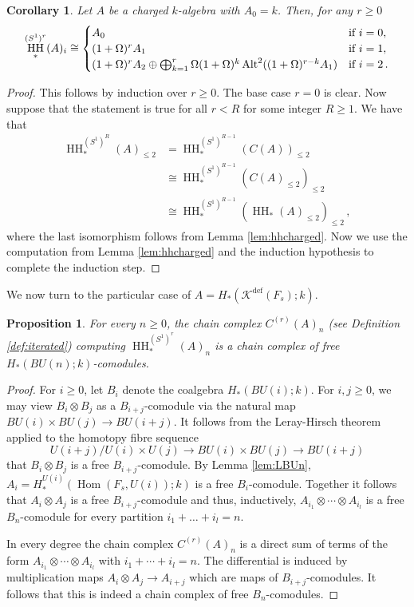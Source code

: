 \documentclass[oneside, a4paper, 12pt]{article}
\numberwithin{equation}{section}
\DeclareMathOperator{\Hom}{Hom}
\DeclareMathOperator{\HH}{HH}
\DeclareMathOperator{\Alt}{Alt}
\newcommand{\Kdef}{\mathcal{K}^{\mathrm{def}}}
\theoremstyle{plain}
\newtheorem{proposition}[theorem]{Proposition}
\newtheorem{corollary}[theorem]{Corollary}
\theoremstyle{definition}
\theoremstyle{remark}
\begin{document}
\begin{corollary} \label{cor:hhchargedalgebra}
Let $A$ be a charged $k$-algebra with $A_0=k$. Then, for any $r\geq 0$
\[
\HH^{(S^1)^r}_\ast(A)_{i}  \cong \begin{cases} A_0 & \textnormal{if }i=0, \\  (1+\Omega)^r A_1 & \textnormal{if }i=1, \\ (1+\Omega)^r A_2\oplus \bigoplus_{k=1}^r \Omega(1+\Omega)^k \Alt^2((1+\Omega)^{r-k}A_1) & \textnormal{if } i=2\, . \end{cases} 
\]
\end{corollary}
\begin{proof}
This follows by induction over $r\geq 0$. The base case $r=0$ is clear. Now suppose that the statement is true for all $r< R$ for some integer $R\geq 1$. We have that
\begin{equation*}
\begin{split}
\HH_\ast^{(S^1)^R}(A)_{\leq 2}& = \HH_\ast^{(S^1)^{R-1}}(C(A))_{\leq 2} \\& \cong \HH_\ast^{(S^1)^{R-1}}(C(A)_{\leq 2})_{\leq 2}  \\& \cong \HH_\ast^{(S^1)^{R-1}}(\HH_\ast(A)_{\leq 2})_{\leq 2} \,,
\end{split}
\end{equation*}
where the last isomorphism follows from Lemma \ref{lem:hhcharged}. Now we use the computation from Lemma \ref{lem:hhcharged} and the induction hypothesis to complete the induction step.
\end{proof}


We now turn to the particular case of $A=H_\ast(\Kdef(F_s);k)$. 



\begin{proposition} \label{prop:complexoffree}
For every $n\geq 0$, the chain complex $C^{(r)}(A)_n$ (see Definition \ref{def:iterated}) computing $\HH_\ast^{(S^1)^r}(A)_n$ is a chain complex of free $H_\ast(BU(n);k)$-comodules.
\end{proposition}
\begin{proof}
For $i\geq 0$, let $B_i$ denote the coalgebra $H_\ast(BU(i);k)$. For $i,j \geq 0$, we may view $B_i\otimes B_j$ as a $B_{i+j}$-comodule via the natural map $BU(i)\times BU(j) \to BU(i+j)$. It follows from the Leray-Hirsch theorem applied to the homotopy fibre sequence
\[
U(i+j)/U(i)\times U(j) \to BU(i)\times BU(j) \to BU(i+j)
\]
that $B_{i}\otimes B_j$ is a free $B_{i+j}$-comodule. By Lemma \ref{lem:LBUn}, $A_i=H_\ast^{U(i)}(\Hom(F_s,U(i));k)$ is a free $B_i$-comodule. Together it follows that $A_i\otimes A_j$ is a free $B_{i+j}$-comodule and thus, inductively, $A_{i_1}\otimes \cdots \otimes A_{i_l}$ is a free $B_n$-comodule for every partition $i_1+\dots + i_l=n$.

In every degree the chain complex $C^{(r)}(A)_n$ is a direct sum of terms of the form $A_{i_1}\otimes \cdots \otimes A_{i_l}$ with $i_1+\cdots + i_l=n$. The differential is induced by multiplication maps $A_{i}\otimes A_j\to A_{i+j}$ which are maps of $B_{i+j}$-comodules. It follows that this is indeed a chain complex of free $B_n$-comodules.
\end{proof}
\end{document}

